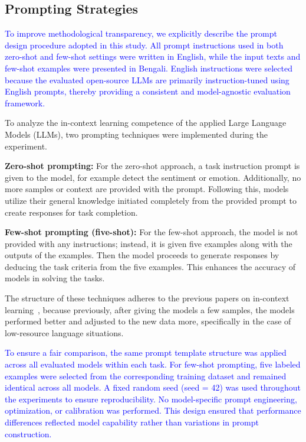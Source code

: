 \documentclass[10pt,letterpaper]{article}
\newcommand{\rev}[1]{\textcolor{blue}{#1}}
\begin{document}
\subsection*{Prompting Strategies}
\label{sec:prompting}

\rev{
To improve methodological transparency, we explicitly describe the prompt design procedure adopted in this study. All prompt instructions used in both zero-shot and few-shot settings were written in English, while the input texts and few-shot examples were presented in Bengali. English instructions were selected because the evaluated open-source LLMs are primarily instruction-tuned using English prompts, thereby providing a consistent and model-agnostic evaluation framework.
}

To analyze the in-context learning competence of the applied Large Language Models (LLMs), two prompting techniques were implemented during the experiment.  

\textbf{Zero-shot prompting:} For the zero-shot approach, a task instruction prompt is given to the model, for example detect the sentiment or emotion. Additionally, no more samples or context are provided with the prompt. Following this, models utilize their general knowledge initiated completely from the provided prompt to create responses for task completion.  

\textbf{Few-shot prompting (five-shot):} For the few-shot approach, the model is not provided with any instructions; instead, it is given five examples along with the outputs of the examples. Then the model proceeds to generate responses by deducing the task criteria from the five examples. This enhances the accuracy of models in solving the tasks. 

The structure of these techniques adheres to the previous papers on in-context learning~\cite{b35,b43}, because previously, after giving the models a few samples, the models performed better and adjusted to the new data more, specifically in the case of low-resource language situations. 

\rev{
To ensure a fair comparison, the same prompt template structure was applied across all evaluated models within each task. For few-shot prompting, five labeled examples were selected from the corresponding training dataset and remained identical across all models. A fixed random seed (seed = 42) was used throughout the experiments to ensure reproducibility. No model-specific prompt engineering, optimization, or calibration was performed. This design ensured that performance differences reflected model capability rather than variations in prompt construction.
}
\end{document}

